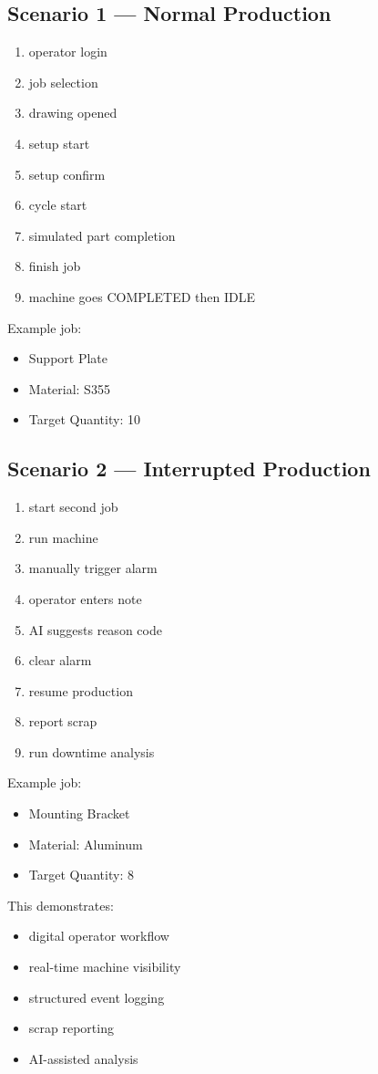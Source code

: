 \documentclass[11pt]{article}
\begin{document}
\subsection{Scenario 1 — Normal Production}
\begin{enumerate}
\item operator login
\item job selection
\item drawing opened
\item setup start
\item setup confirm
\item cycle start
\item simulated part completion
\item finish job
\item machine goes COMPLETED then IDLE
\end{enumerate}

Example job:
\begin{itemize}
\item Support Plate
\item Material: S355
\item Target Quantity: 10
\end{itemize}

\subsection{Scenario 2 — Interrupted Production}
\begin{enumerate}
\item start second job
\item run machine
\item manually trigger alarm
\item operator enters note
\item AI suggests reason code
\item clear alarm
\item resume production
\item report scrap
\item run downtime analysis
\end{enumerate}

Example job:
\begin{itemize}
\item Mounting Bracket
\item Material: Aluminum
\item Target Quantity: 8
\end{itemize}

This demonstrates:
\begin{itemize}
\item digital operator workflow
\item real-time machine visibility
\item structured event logging
\item scrap reporting
\item AI-assisted analysis
\end{itemize}
\end{document}
